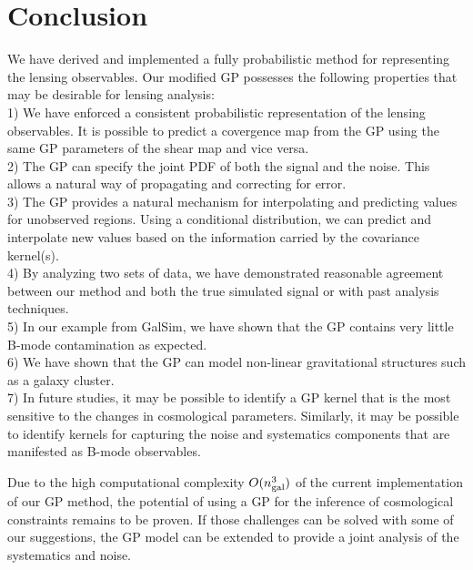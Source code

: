 \section{Conclusion}
We have derived and implemented a fully probabilistic method for 
representing the lensing observables. 
Our modified GP possesses the following properties that may be desirable
for lensing analysis: \\ 
1) We have enforced a consistent probabilistic representation of the lensing 
observables. It is possible to predict a covergence map from the GP using
the same GP parameters of the shear map and vice versa.\\ 
2) The GP can specify the joint PDF of both the signal and the noise. 
This allows a natural way of propagating and correcting for error.\\
3) The GP provides a natural mechanism for interpolating  
and predicting values for unobserved regions. Using a conditional distribution, 
we can predict and interpolate new values based on the  information carried by
the covariance kernel(s).
\\ 
4) By analyzing two sets of data, 
we have demonstrated reasonable agreement between our method and both the true
simulated signal or with past analysis techniques.  \\
5) In our example from {\sc GalSim}, we have shown that the GP contains very
little B-mode contamination as expected. \\
6) We have shown that the GP can model non-linear gravitational structures such 
as a galaxy cluster.\\ 
7) In future studies, it may be possible to identify a GP kernel that is the most 
sensitive to the changes in cosmological parameters. Similarly, it may be
possible to identify kernels for capturing the noise and systematics components 
that are manifested as B-mode observables.

Due to the high computational complexity $O(n_{\rm gal}^3)$ of the current
implementation of our GP method,  
the potential of using a GP for the inference of cosmological
constraints remains to be proven. 
If those challenges can be solved with some of our
suggestions, the GP model can be 
extended to provide a joint analysis of the systematics and noise. 




